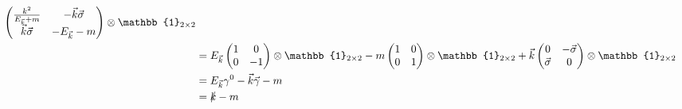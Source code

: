 \documentclass{report}
\begin{document}
\begin{align*}
\begin{pmatrix}
	\frac{k^2}{E_{\vec{k}} + m} & -\vec{k}\vec{\sigma} \\
		\vec{k}\vec{\sigma} & -E_{\vec{k}} - m
	\end{pmatrix}
	\otimes \mathbb{1}_{2\times2}\\
	& = E_{\vec{k}} 
	\begin{pmatrix}
		1 & 0\\
		0 & -1
	\end{pmatrix} \otimes \mathbb{1}_{2\times2} 
	- m\begin{pmatrix}
		1 & 0\\
		0 & 1
	\end{pmatrix} \otimes \mathbb{1}_{2\times2}  
	+ \vec{k} \begin{pmatrix}
		0 & -\vec{\sigma}\\
		\vec{\sigma} & 0
	\end{pmatrix}\otimes \mathbb{1}_{2\times2}\\
	& = E_{\vec{k}} \gamma^0 - \vec{k}\vec{\gamma} - m \\
	& = \slashed{k} - m
\end{align*}
	
	
\end{document}
